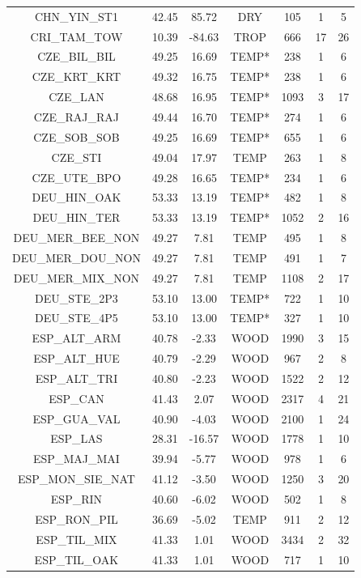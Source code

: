 \documentclass[11pt,twoside]{reedthesis}
\begin{document}
\begin{longtable}[t]{ccccccc}
CHN\_YIN\_ST1 & 42.45 & 85.72 & DRY & 105 & 1 & 5\\
CRI\_TAM\_TOW & 10.39 & -84.63 & TROP & 666 & 17 & 26\\
CZE\_BIL\_BIL & 49.25 & 16.69 & TEMP* & 238 & 1 & 6\\
CZE\_KRT\_KRT & 49.32 & 16.75 & TEMP* & 238 & 1 & 6\\
CZE\_LAN & 48.68 & 16.95 & TEMP* & 1093 & 3 & 17\\
CZE\_RAJ\_RAJ & 49.44 & 16.70 & TEMP* & 274 & 1 & 6\\
CZE\_SOB\_SOB & 49.25 & 16.69 & TEMP* & 655 & 1 & 6\\
CZE\_STI & 49.04 & 17.97 & TEMP & 263 & 1 & 8\\
CZE\_UTE\_BPO & 49.28 & 16.65 & TEMP* & 234 & 1 & 6\\
DEU\_HIN\_OAK & 53.33 & 13.19 & TEMP* & 482 & 1 & 8\\
DEU\_HIN\_TER & 53.33 & 13.19 & TEMP* & 1052 & 2 & 16\\
DEU\_MER\_BEE\_NON & 49.27 & 7.81 & TEMP & 495 & 1 & 8\\
DEU\_MER\_DOU\_NON & 49.27 & 7.81 & TEMP & 491 & 1 & 7\\
DEU\_MER\_MIX\_NON & 49.27 & 7.81 & TEMP & 1108 & 2 & 17\\
DEU\_STE\_2P3 & 53.10 & 13.00 & TEMP* & 722 & 1 & 10\\
DEU\_STE\_4P5 & 53.10 & 13.00 & TEMP* & 327 & 1 & 10\\
ESP\_ALT\_ARM & 40.78 & -2.33 & WOOD & 1990 & 3 & 15\\
ESP\_ALT\_HUE & 40.79 & -2.29 & WOOD & 967 & 2 & 8\\
ESP\_ALT\_TRI & 40.80 & -2.23 & WOOD & 1522 & 2 & 12\\
ESP\_CAN & 41.43 & 2.07 & WOOD & 2317 & 4 & 21\\
ESP\_GUA\_VAL & 40.90 & -4.03 & WOOD & 2100 & 1 & 24\\
ESP\_LAS & 28.31 & -16.57 & WOOD & 1778 & 1 & 10\\
ESP\_MAJ\_MAI & 39.94 & -5.77 & WOOD & 978 & 1 & 6\\
ESP\_MON\_SIE\_NAT & 41.12 & -3.50 & WOOD & 1250 & 3 & 20\\
ESP\_RIN & 40.60 & -6.02 & WOOD & 502 & 1 & 8\\
ESP\_RON\_PIL & 36.69 & -5.02 & TEMP & 911 & 2 & 12\\
ESP\_TIL\_MIX & 41.33 & 1.01 & WOOD & 3434 & 2 & 32\\
ESP\_TIL\_OAK & 41.33 & 1.01 & WOOD & 717 & 1 & 10\\

\end{longtable}
\end{document}
